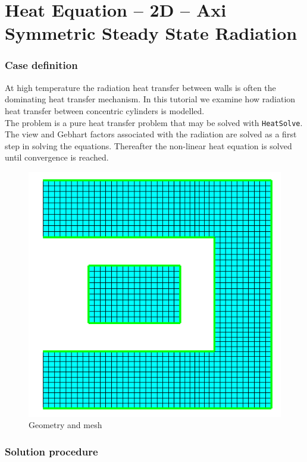 \chapter{Heat Equation -- 2D -- Axi Symmetric Steady State Radiation}



\subsection*{Case definition}

At high temperature the radiation heat transfer between walls 
is often the dominating heat transfer mechanism. In this
tutorial we examine how radiation heat transfer between 
concentric cylinders is modelled.\\

The problem is a pure heat transfer problem that may be solved
with \texttt{HeatSolve}. The view and Gebhart factors 
associated with the radiation are solved as a first step 
in solving the equations. Thereafter the non-linear heat equation 
is solved until convergence is reached.


\begin{figure}
\begin{center}
\includegraphics[width=100 mm]{geometry}
\caption{Geometry and mesh}\label{fg:geometry}
\end{center}
\end{figure}  


\subsection*{Solution procedure}

